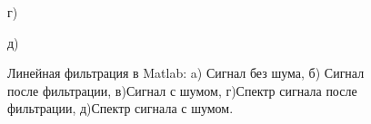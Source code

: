 \documentclass[10pt,a4paper]{article}
\begin{document}
\begin{figure}[H]
\vfill
\begin{minipage}[h]{0.6\linewidth}
 г) \\
\end{minipage}
\hfill
\begin{minipage}[h]{0.6\linewidth}
 д) \\
\end{minipage}
\caption{Линейная фильтрация в Matlab: a) Сигнал без шума, б)
Сигнал после фильтрации, в)Сигнал с шумом, г)Спектр сигнала после фильтрации, д)Спектр сигнала с шумом.}
\label{ris:experimentalcorrelationsignals}
\end{figure}
\FloatBarrier
\end{document}
